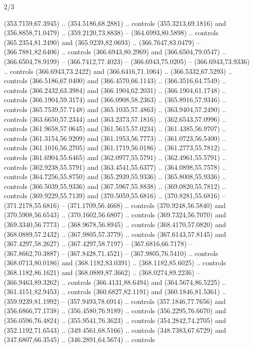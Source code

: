 \begin{flagdescription}{2/3}
\begin{scope}[xshift=0.5\flaglength,yshift=0.5\flagwidth,scale=\flagwidth/311.22]
\begin{scope}[y=0.8pt, x=0.8pt, yscale=-1,shift={(-291.77,-194.51)}]
  (353.7159,67.3945) .. (354.5186,68.2881) .. controls (355.3213,69.1816) and
  (356.8858,71.0479) .. (359.2120,73.8838) -- (364.6993,80.5898) .. controls
  (365.2354,81.2490) and (365.9239,82.0693) .. (366.7647,83.0479) --
  (366.7881,82.6406) .. controls (366.6943,80.2969) and (366.6504,79.0547) ..
  (366.6504,78.9199) -- (366.7412,77.4023) -- (366.6943,75.0205) --
  (366.6943,73.9336) .. controls (366.6943,73.2422) and (366.6416,71.1064) ..
  (366.5332,67.5293) .. controls (366.5186,67.0400) and (366.4570,66.1143) ..
  (366.3516,64.7549) .. controls (366.2432,63.3984) and (366.1904,62.2031) ..
  (366.1904,61.1748) .. controls (366.1904,59.3174) and (366.0908,58.2363) ..
  (365.8916,57.9346) .. controls (365.7539,57.7148) and (365.1035,57.4863) ..
  (363.9404,57.2490) .. controls (363.6650,57.2344) and (363.2373,57.1816) ..
  (362.6543,57.0996) .. controls (361.9658,57.0645) and (361.5615,57.0234) ..
  (361.4385,56.9707) .. controls (361.3154,56.9209) and (361.1953,56.7773) ..
  (361.0723,56.5400) .. controls (361.1016,56.2705) and (361.1719,56.0186) ..
  (361.2773,55.7812) .. controls (361.6904,55.6465) and (362.0977,55.5791) ..
  (362.4961,55.5791) .. controls (362.9238,55.5791) and (363.4541,55.6377) ..
  (364.0898,55.7578) .. controls (364.7256,55.8750) and (365.2939,55.9336) ..
  (365.8008,55.9336) .. controls (366.5039,55.9336) and (367.5967,55.8838) ..
  (369.0820,55.7812) .. controls (369.9229,55.7139) and (370.5059,55.6816) ..
  (370.8281,55.6816) -- (371.2178,55.6816) -- (371.1709,56.4668) .. controls
  (370.9248,56.5840) and (370.5908,56.6543) .. (370.1602,56.6807) .. controls
  (369.7324,56.7070) and (369.3340,56.7773) .. (368.9678,56.8945) .. controls
  (368.4170,57.0820) and (368.0889,57.2432) .. (367.9805,57.3779) .. controls
  (367.6143,57.8145) and (367.4297,58.2627) .. (367.4297,58.7197) --
  (367.6816,66.7178) -- (367.8662,70.3887) -- (367.8428,71.4521) --
  (367.9805,76.5410) .. controls (368.0713,80.0186) and (368.1182,83.0391) ..
  (368.1182,85.6025) .. controls (368.1182,86.1621) and (368.0889,87.3662) ..
  (368.0274,89.2236) -- (366.9463,89.3262) .. controls (366.4131,88.6494) and
  (364.5674,86.5225) .. (361.4151,82.9453) .. controls (360.6827,82.1191) and
  (360.1846,81.5361) .. (359.9239,81.1992) -- (357.9493,78.6914) .. controls
  (357.1846,77.7656) and (356.6866,77.1738) .. (356.4580,76.9189) .. controls
  (356.2295,76.6670) and (356.0596,76.4824) .. (355.9541,76.3623) .. controls
  (354.2842,74.2705) and (352.1192,71.6543) .. (349.4561,68.5166) .. controls
  (348.7383,67.6729) and (347.6807,66.3545) .. (346.2891,64.5674) .. controls

\end{scope}
\end{scope}
\end{flagdescription}
